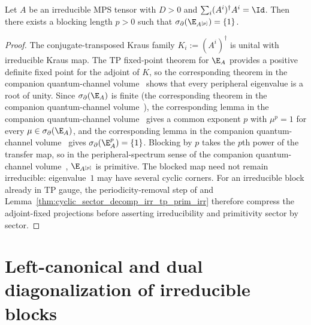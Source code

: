 \begin{lemma}
    \label{thm:blocking_primitivity}
    \leanok
    Let $A$ be an irreducible MPS tensor with $D>0$ and
    $\sum_i(A^i)^\dagger A^i=\Id$. Then there exists a blocking length $p>0$
    such that $\sigma_\partial(\E_{A^{[p]}})=\{1\}$.
\end{lemma}

\begin{proof}\leanok
    The conjugate-transposed Kraus family $K_i:=(A^i)^\dagger$
    is unital with irreducible Kraus map. The TP fixed-point theorem for
    $\E_A$ provides a positive definite fixed point for the adjoint of $K$, so
    the corresponding theorem in the companion quantum-channel volume~\cite[``Roots of unity via adjoint fixed point'']{QICLean2026Blueprint} shows that every peripheral
    eigenvalue is a root of unity. Since $\sigma_\partial(\E_A)$ is finite
    (the corresponding theorem in the companion quantum-channel volume~\cite[``Finiteness of peripheral eigenvalues'']{QICLean2026Blueprint}),
    the corresponding lemma in the companion quantum-channel volume~\cite[``Common exponent for a finite set of roots of unity'']{QICLean2026Blueprint} gives a common exponent $p$ with
    $\mu^p=1$ for every $\mu\in\sigma_\partial(\E_A)$, and
    the corresponding lemma in the companion quantum-channel volume~\cite[``Powering collapses peripheral eigenvalues'']{QICLean2026Blueprint} gives
    $\sigma_\partial(\E_A^p)=\{1\}$. Blocking by $p$ takes the $p$th power of
    the transfer map, so in the peripheral-spectrum sense of the companion quantum-channel volume~\cite[``Primitive map'']{QICLean2026Blueprint}, $\E_{A^{[p]}}$ is primitive.
    The blocked map need not remain irreducible: eigenvalue~$1$ may have several
    cyclic corners. For an irreducible block already in TP gauge, the
    periodicity-removal step of \cite[Section~2.3]{Cirac2016MPDO_arXiv} and
    Lemma~\ref{thm:cyclic_sector_decomp_irr_tp_prim_irr} therefore compress
    the adjoint-fixed projections before asserting irreducibility and
    primitivity sector by sector.
\end{proof}

\section{Left-canonical and dual diagonalization of irreducible blocks}%
\label{sec:canonical_construction_1606}


